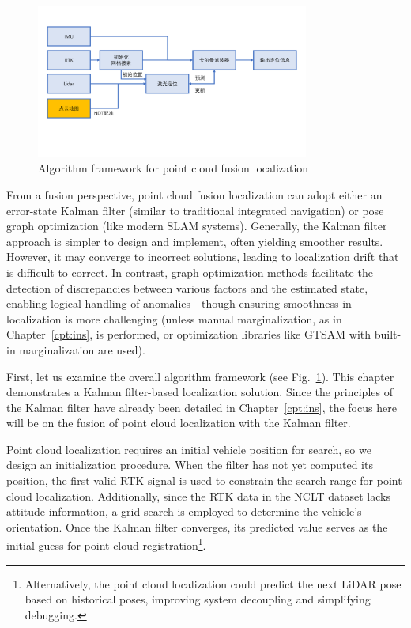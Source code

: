 \begin{figure}[!htp]  
	\centering  
	\includegraphics[width=0.8\textwidth]{resources/localization/framework}  
	\caption{Algorithm framework for point cloud fusion localization}  
	\label{fig:localization-framework}  
\end{figure}  

From a fusion perspective, point cloud fusion localization can adopt either an error-state Kalman filter (similar to traditional integrated navigation) or pose graph optimization (like modern SLAM systems). Generally, the Kalman filter approach is simpler to design and implement, often yielding smoother results. However, it may converge to incorrect solutions, leading to localization drift that is difficult to correct. In contrast, graph optimization methods facilitate the detection of discrepancies between various factors and the estimated state, enabling logical handling of anomalies—though ensuring smoothness in localization is more challenging (unless manual marginalization, as in Chapter~\ref{cpt:ins}, is performed, or optimization libraries like GTSAM with built-in marginalization are used).  

First, let us examine the overall algorithm framework (see Fig.~\ref{fig:localization-framework}). This chapter demonstrates a Kalman filter-based localization solution. Since the principles of the Kalman filter have already been detailed in Chapter~\ref{cpt:ins}, the focus here will be on the fusion of point cloud localization with the Kalman filter.  

Point cloud localization requires an initial vehicle position for search, so we design an initialization procedure. When the filter has not yet computed its position, the first valid RTK signal is used to constrain the search range for point cloud localization. Additionally, since the RTK data in the NCLT dataset lacks attitude information, a grid search is employed to determine the vehicle's orientation. Once the Kalman filter converges, its predicted value serves as the initial guess for point cloud registration\footnote{Alternatively, the point cloud localization could predict the next LiDAR pose based on historical poses, improving system decoupling and simplifying debugging.}.  

